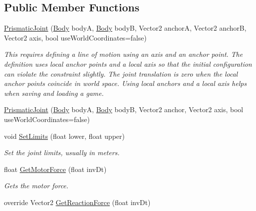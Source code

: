 \subsection*{Public Member Functions}
\begin{DoxyCompactItemize}
\item 
\hyperlink{class_farseer_physics_1_1_dynamics_1_1_joints_1_1_prismatic_joint_a5a513512c3a66a4bc72b0c8514147aeb}{Prismatic\+Joint} (\hyperlink{class_farseer_physics_1_1_dynamics_1_1_body}{Body} body\+A, \hyperlink{class_farseer_physics_1_1_dynamics_1_1_body}{Body} body\+B, Vector2 anchor\+A, Vector2 anchor\+B, Vector2 axis, bool use\+World\+Coordinates=false)
\begin{DoxyCompactList}\small\item\em This requires defining a line of motion using an axis and an anchor point. The definition uses local anchor points and a local axis so that the initial configuration can violate the constraint slightly. The joint translation is zero when the local anchor points coincide in world space. Using local anchors and a local axis helps when saving and loading a game. \end{DoxyCompactList}\item 
\hyperlink{class_farseer_physics_1_1_dynamics_1_1_joints_1_1_prismatic_joint_a892fa1e20b96c295664100830fa7c616}{Prismatic\+Joint} (\hyperlink{class_farseer_physics_1_1_dynamics_1_1_body}{Body} body\+A, \hyperlink{class_farseer_physics_1_1_dynamics_1_1_body}{Body} body\+B, Vector2 anchor, Vector2 axis, bool use\+World\+Coordinates=false)
\item 
void \hyperlink{class_farseer_physics_1_1_dynamics_1_1_joints_1_1_prismatic_joint_a4c3d0dbc5ab731fa30c95ce03c425b49}{Set\+Limits} (float lower, float upper)
\begin{DoxyCompactList}\small\item\em Set the joint limits, usually in meters. \end{DoxyCompactList}\item 
float \hyperlink{class_farseer_physics_1_1_dynamics_1_1_joints_1_1_prismatic_joint_a6206382a684948e0d2285b599dc39895}{Get\+Motor\+Force} (float inv\+Dt)
\begin{DoxyCompactList}\small\item\em Gets the motor force. \end{DoxyCompactList}\item 
override Vector2 \hyperlink{class_farseer_physics_1_1_dynamics_1_1_joints_1_1_prismatic_joint_aa948e6e01ecceaf8f6e525ea69b0bec5}{Get\+Reaction\+Force} (float inv\+Dt)

\end{DoxyCompactItemize}
